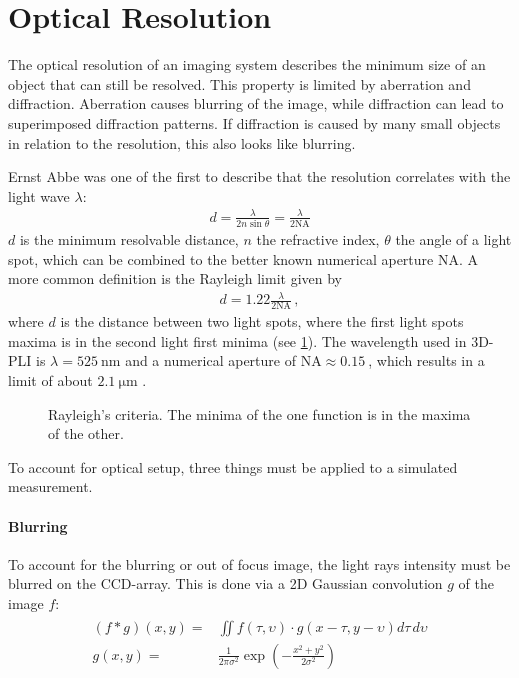 \section{Optical Resolution}
\label{sec:opticalResolution}
%
The optical resolution of an imaging system describes the minimum size of an object that can still be resolved.
This property is limited by aberration and diffraction.
Aberration causes blurring of the image, while diffraction can lead to superimposed diffraction patterns.
If diffraction is caused by many small objects in relation to the resolution, this also looks like blurring.
\par
%
Ernst Abbe was one of the first to describe that the resolution correlates with the light wave $\lambda$:
\begin{align}
d=\frac{ \lambda}{2 n \sin \theta} = \frac{\lambda}{2\mathrm{NA}} 
\end{align}
$d$ is the minimum resolvable distance, $n$ the refractive index, $\theta$ the angle of a light spot, which can be combined to the better known numerical aperture $\mathrm{NA}$.
A more common definition is the Rayleigh limit given by
\begin{align}
d=1.22\frac{\lambda}{2\mathrm{NA}} \, ,
\end{align}
where $d$ is the distance between two light spots, where the first light spots maxima is in the second light first minima (see \cref{fig:rayleigh}).
The wavelength used in \ac{3D-PLI} is $\lambda = \SI{525}{\nano\meter}$ and a numerical aperture of $\mathrm{NA} \approx \SI{0.15}{}$, which results in a limit of about $\SI{2.1}{\micro\meter}$ \cite{MenzelDissertation}.
%
\begin{figure}[!t]
\setlength{\tikzwidth}{0.5\textwidth}
\centering
\caption[Raylay criterium]{Rayleigh's criteria. The minima of the one function is in the maxima of the other.}
\label{fig:rayleigh}
\end{figure}
%
To account for optical setup, three things must be applied to a simulated measurement.
%
\paragraph{Blurring}
To account for the blurring or out of focus image, the light rays intensity must be blurred on the \ac{CCD}-array.
This is done via a 2D Gaussian convolution $g$ of the image $f$:
\begin{align}
\begin{split}
    (f * g)(x,y) =& \iint f(\tau,\upsilon) \cdot g(x-\tau, y-\upsilon)d\tau \, d\upsilon\\
    g(x,y) =& \frac{1}{2\pi\sigma^2} \exp(-\frac{x^2+y^2}{2\sigma^2})
\end{split}
\end{align}
%
